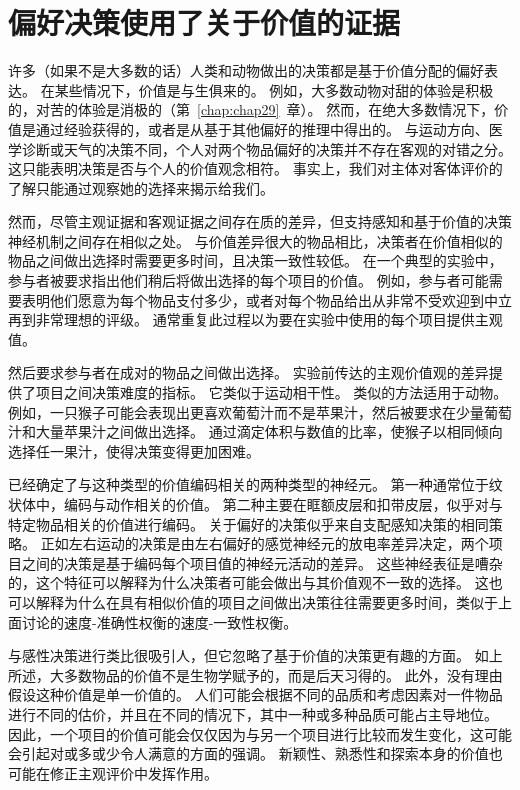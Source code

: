 \section{偏好决策使用了关于价值的证据}

许多（如果不是大多数的话）人类和动物做出的决策都是基于价值分配的偏好表达。 
在某些情况下，价值是与生俱来的。
例如，大多数动物对甜的体验是积极的，对苦的体验是消极的（第~\ref{chap:chap29}~章）。
然而，在绝大多数情况下，价值是通过经验获得的，或者是从基于其他偏好的推理中得出的。
与运动方向、医学诊断或天气的决策不同，个人对两个物品偏好的决策并不存在客观的对错之分。
这只能表明决策是否与个人的价值观念相符。
事实上，我们对主体对客体评价的了解只能通过观察她的选择来揭示给我们。


然而，尽管主观证据和客观证据之间存在质的差异，但支持感知和基于价值的决策神经机制之间存在相似之处。
与价值差异很大的物品相比，决策者在价值相似的物品之间做出选择时需要更多时间，且决策一致性较低。
在一个典型的实验中，参与者被要求指出他们稍后将做出选择的每个项目的价值。
例如，参与者可能需要表明他们愿意为每个物品支付多少，或者对每个物品给出从非常不受欢迎到中立再到非常理想的评级。
通常重复此过程以为要在实验中使用的每个项目提供主观值。


然后要求参与者在成对的物品之间做出选择。
实验前传达的主观价值观的差异提供了项目之间决策难度的指标。
它类似于运动相干性。
类似的方法适用于动物。
例如，一只猴子可能会表现出更喜欢葡萄汁而不是苹果汁，然后被要求在少量葡萄汁和大量苹果汁之间做出选择。
通过滴定体积与数值的比率，使猴子以相同倾向选择任一果汁，使得决策变得更加困难。


已经确定了与这种类型的价值编码相关的两种类型的神经元。
第一种通常位于纹状体中，编码与动作相关的价值。
第二种主要在眶额皮层和扣带皮层，似乎对与特定物品相关的价值进行编码。
关于偏好的决策似乎来自支配感知决策的相同策略。
正如左右运动的决策是由左右偏好的感觉神经元的放电率差异决定，两个项目之间的决策是基于编码每个项目值的神经元活动的差异。
这些神经表征是嘈杂的，这个特征可以解释为什么决策者可能会做出与其价值观不一致的选择。
这也可以解释为什么在具有相似价值的项目之间做出决策往往需要更多时间，类似于上面讨论的速度-准确性权衡的速度-一致性权衡。


与感性决策进行类比很吸引人，但它忽略了基于价值的决策更有趣的方面。
如上所述，大多数物品的价值不是生物学赋予的，而是后天习得的。
此外，没有理由假设这种价值是单一价值的。
人们可能会根据不同的品质和考虑因素对一件物品进行不同的估价，并且在不同的情况下，其中一种或多种品质可能占主导地位。
因此，一个项目的价值可能会仅仅因为与另一个项目进行比较而发生变化，这可能会引起对或多或少令人满意的方面的强调。
新颖性、熟悉性和探索本身的价值也可能在修正主观评价中发挥作用。



